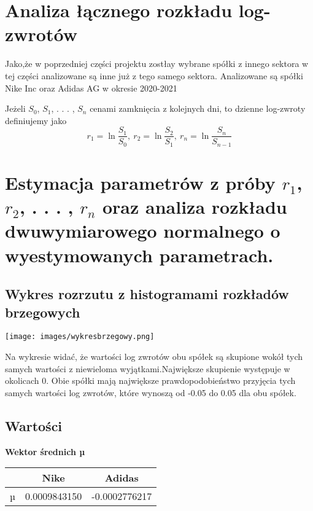 \documentclass[a4paper,11pt]{article}
\begin{document}
\newpage
\section*{Analiza łącznego rozkładu log-zwrotów}
{Jako,że w poprzedniej części projektu zostłay wybrane spółki z innego sektora w tej części analizowane są inne już z tego samego sektora. Analizowane są spółki Nike Inc oraz Adidas  AG w okresie 2020-2021 \newline}
\begin{flushleft}
    

{Jeżeli $S_{0}$, $S_{1}$, . . . , $S_{n}$ cenami zamknięcia z kolejnych dni, to dzienne log-zwroty definiujemy jako
$$r_{1} =\ln\frac{S_{1}}{S_{0}},\:r_{2} =\ln\frac{S_{2}}{S_{1}},\:r_{n} =\ln\frac{S_{n}}{S_{n-1}}$$}
\end{flushleft}

\section{Estymacja parametrów z próby  $r_{1}$, $r_{2}$, . . . , $r_{n}$ oraz analiza rozkładu dwuwymiarowego normalnego o wyestymowanych parametrach.}

\subsection{Wykres rozrzutu z histogramami rozkładów brzegowych}

\begin{center}
\texttt{[image: images/wykresbrzegowy.png]}

\end{center}
\begin{flushleft}
{Na wykresie widać, że wartości log zwrotów obu spółek są skupione wokół tych samych wartości z niewieloma wyjątkami.Największe skupienie występuje w okolicach 0.
Obie spółki mają największe prawdopodobieństwo przyjęcia tych samych wartości log zwrotów, które wynoszą od -0.05 do 0.05 dla obu spółek.}
\end{flushleft}

\subsection{Wartości}


\begin{center}
{\textbf{Wektor
średnich µ}}\\
\begin{tabular}{ |c | c | c|} 
  \hline
    & Nike & Adidas  \\ 
  \hline
 µ & 0.0009843150    & -0.0002776217  \\ 
  \hline

\end{tabular}
\end{center}
\end{document}
